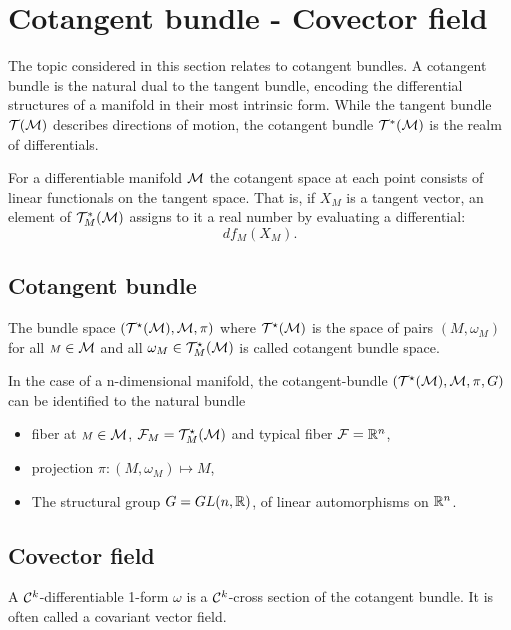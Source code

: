 \section{Cotangent bundle - Covector field}
The topic considered in this section relates to cotangent bundles. A cotangent bundle is the natural dual to the tangent bundle, encoding the differential structures of a manifold in their most intrinsic form. While the tangent bundle $\mathcal{T}(\mathcal{M})$ describes directions of motion, the cotangent bundle 
$\mathcal{T}^*(\mathcal{M})$  is the realm of differentials. 

For a differentiable manifold $\mathcal{M}$  the cotangent space at each point consists of linear functionals on the tangent space. That is, if $X_{\scriptstyle M}$ is a tangent vector, an element of $\mathcal{T}_{\scriptstyle M}^*(\mathcal{M})$ assigns to it a real number by evaluating a differential:
\[df_{\scriptstyle M}(X_{\scriptstyle M}).\]
\subsection{Cotangent bundle}

\begin{definition}
The bundle space $(\mathcal{T}^\star(\mathcal{M}),\mathcal{M},\pi)$ where $\mathcal{T}^\star(\mathcal{M})$ is the space of pairs
$({\scriptstyle M},\omega_{\scriptstyle M})$ for all ${\scriptstyle M}\in \mathcal{M}$ and all $\omega_{\scriptstyle M}\in \mathcal{T}^\star_{\scriptstyle M}(\mathcal{M})$ is called
cotangent bundle space. 
\end{definition}

In the case of a n-dimensional manifold,
the cotangent-bundle  $(\mathcal{T}^{\star}(\mathcal{M}), \mathcal{M}, \pi,G)$ can be identified to the natural bundle
\begin{itemize}
	\item  fiber at ${\scriptstyle M} \in \mathcal{M}$, $\mathcal{F}_{\scriptstyle M}= \mathcal{T}^{\star}_{\scriptstyle M}(\mathcal{M})$ and typical
fiber $\mathcal{F} =\mathbb{R}^n$,  

	\item projection $\pi : ({\scriptstyle M},\omega_{\scriptstyle M}) \mapsto {\scriptstyle M} $, 
		
	\item The structural group $G=GL(n,\mathbb{R})$,   of linear automorphisms on
$\mathbb{R}^n$.
\end{itemize}

\subsection{Covector field}
\begin{definition}
 A $\mathcal{C}^k$-differentiable 1-form $\omega$ is a $\mathcal{C}^k$-cross section of the cotangent bundle. It is often called a covariant vector field.
\end{definition}

